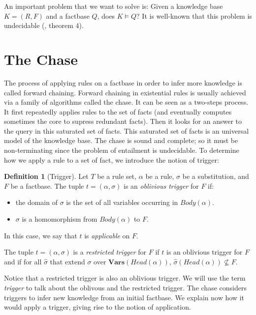 \documentclass{article}
\theoremstyle{definition}
\newtheorem{definition}{Definition}[section]
\theoremstyle{remark}
\newcommand{\Vars}{\textbf{Vars}}
\begin{document}
An important problem that we want to solve is: Given a knowledge base $K=(R,F)$ and a factbase $Q$,  does $K \vDash Q$? It  is  well-known  that  this  problem  is  undecidable (\cite{NP2}, theorem 4). 



\section{The Chase}

The process of applying rules on a factbase in order to infer more knowledge is called forward chaining.   Forward  chaining  in  existential  rules  is  usually achieved  via  a  family  of  algorithms  called the  chase. It can be seen as a two-steps process. It first repeatedly applies rules to the set of facts (and eventually computes sometimes the core to supress redundant facts). Then it looks for an answer to the query in this saturated set of facts. This saturated set of facts is an universal model of the knowledge base. The chase is sound and complete; so it must be non-terminating since the problem of entailment is undecidable. To determine how we apply a rule to a set of fact, we introduce the notion of trigger:

\begin{definition}[Trigger]
Let $T$ be a rule set, $\alpha$ be a rule, $\sigma$ be a substitution, and $F$ be a factbase. The tuple $t = (\alpha,\sigma)$ is an \emph{oblivious trigger} for $F$ if: 
\begin{itemize}
\item the domain of $\sigma$ is the set of all variables occurring in $Body(\alpha)$.
\item $\sigma$ is a homomorphism from $Body(\alpha)$ to $F$.
\end{itemize}
In this case, we say that $t$ is \emph{applicable} on $F$.

The tuple $t = (\alpha,\sigma)$ is a \emph{restricted trigger} for $F$ if $t$ is an oblivious trigger for $F$ and if for all $\hat \sigma$ that extend $\sigma$ over $\Vars(\textit{Head}(\alpha))$, $\hat \sigma(Head(\alpha)) \nsubseteq F$.
\end{definition} 



Notice that a restricted trigger is also an oblivious trigger. We will use the term \emph{trigger} to talk about the oblivous and the restricted trigger. The chase considers triggers to infer new knowledge from an initial factbase. We explain now how it would apply a trigger, giving rise to the notion of application. 
\end{document}
